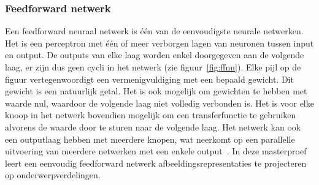\subsubsection{Feedforward netwerk}
\label{par:concept}
Een feedforward neuraal netwerk is \'e\'en van de eenvoudigste neurale netwerken. Het is een perceptron met \'e\'en of meer verborgen lagen van neuronen tussen input en output. De outputs van elke laag worden enkel doorgegeven aan de volgende laag, er zijn dus geen cycli in het netwerk (zie figuur~\ref{fig:ffnn}). Elke pijl op de figuur vertegenwoordigt een vermenigvuldiging met een bepaald gewicht. Dit gewicht is een natuurlijk getal. Het is ook mogelijk om gewichten te hebben met waarde nul, waardoor de volgende laag niet volledig verbonden is. Het is voor elke knoop in het netwerk bovendien mogelijk om een transferfunctie te gebruiken alvorens de waarde door te sturen naar de volgende laag. Het netwerk kan ook een outputlaag hebben met meerdere knopen, wat neerkomt op een parallelle uitvoering van meerdere netwerken met een enkele output~\cite{Bishop:1995:NNP:525960}. 
In deze masterproef leert een eenvoudig feedforward netwerk afbeeldingsrepresentaties te projecteren op onderwerpverdelingen.

